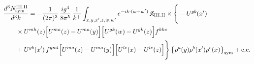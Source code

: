 \begingroup\small
\begin{align}\label{eq:H-III.II-3}
&\frac{d^{3}N^{\rm III.II}_{{\rm sym}}}{d^{3}k}=-\frac{1}{(2\pi)^{3}}\, \frac{ig^{4}}{8\pi^{5}}\, \frac{1}{k^{+}} \int_{x,y,x',z,w,w'}e^{-ik\cdot(w-w')}\, \mathfrak{K}_{\rm III.II} \times \Bigg\{-U^{gb}(x')\notag\\
&\quad\quad \times U^{mh}(z)\Big[U^{ma}(z)-U^{ma}(y)\Big]\Big[U^{gk}(w)-U^{gk}(z)\Big]f^{khc}\notag\\
&\quad\quad +U^{gb}(x')\, f^{gml}\Big[U^{ma}(z)-U^{ma}(y)\Big]\Big[U^{lc}(x)-U^{lc}(z)\Big]\Bigg\}\, \big\{\rho^{a}(y)\rho^{b}(x')\rho^{c}(x)\big\}_{\rm sym} +{\rm c.c.}
\end{align}
\endgroup

